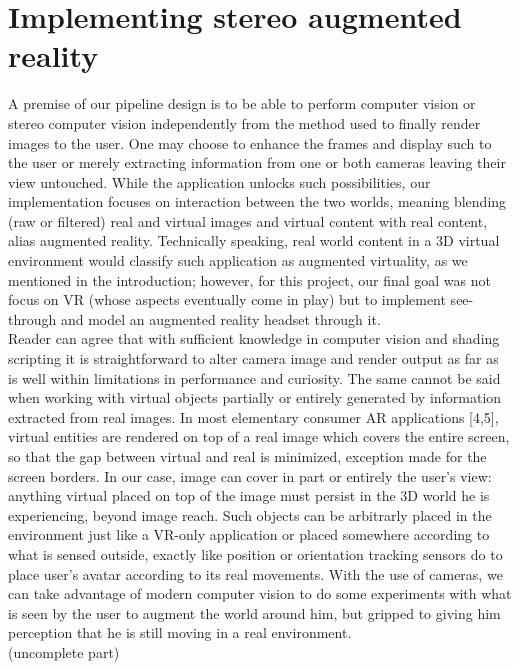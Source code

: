 \section{Implementing stereo augmented reality}
A premise of our pipeline design is to be able to perform computer vision or stereo computer vision independently from the method used to finally render images to the user. One may choose to enhance the frames and display such to the user or merely extracting information from one or both cameras leaving their view untouched. While the application unlocks such possibilities, our implementation focuses on interaction between the two worlds, meaning blending (raw or filtered) real and virtual images and virtual content with real content, alias augmented reality. Technically speaking, real world content in a 3D virtual environment would classify such application as augmented virtuality, as we mentioned in the introduction; however, for this project, our final goal was not focus on VR (whose aspects eventually come in play) but to implement see-through and model an augmented reality headset through it.\\
Reader can agree that with sufficient knowledge in computer vision and shading scripting it is straightforward to alter camera image and render output as far as is well within limitations in performance and curiosity. The same cannot be said when working with virtual objects partially or entirely generated by information extracted from real images. In most elementary consumer AR applications [4,5], virtual entities are rendered on top of a real image which covers the entire screen, so that the gap between virtual and real is minimized, exception made for the screen borders. In our case, image can cover in part or entirely the user’s view: anything virtual placed on top of the image must persist in the 3D world he is experiencing, beyond image reach. Such objects can be arbitrarly placed in the environment just like a VR-only application or placed somewhere according to what is sensed outside, exactly like position or orientation tracking sensors do to place user’s avatar according to its real movements. With the use of cameras, we can take advantage of modern computer vision to do some experiments with what is seen by the user to augment the world around him, but gripped to giving him perception that he is still moving in a real environment.\\

(uncomplete part)

